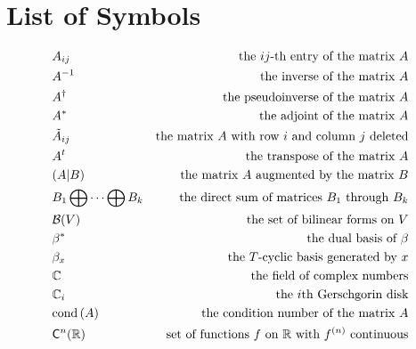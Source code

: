 \chapter{List of Symbols}
\begin{align*}
	 & A_{ij}                            & \text{the $ij$-th entry of the matrix $A$}                                       \\
	 & A^{-1}                            & \text{the inverse of the matrix $A$}                                             \\
	 & A^\dag                            & \text{the pseudoinverse of the matrix $A$}                                       \\
	 & A^*                               & \text{the adjoint of the matrix $A$}                                             \\
	 & \tilde{A}_{ij}                    & \text{the matrix $A$ with row $i$ and column $j$ deleted}                        \\
	 & A^t                               & \text{the transpose of the matrix $A$}                                           \\
	 & (A|B)                             & \text{the matrix $A$ augmented by the matrix $B$}                                \\
	 & B_1 \bigoplus \dots \bigoplus B_k & \text{the direct sum of matrices $B_1$ through $B_k$}                            \\
	 & \mathcal{B}(V)                    & \text{the set of bilinear forms on $V$}                                          \\
	 & \beta^*                           & \text{the dual basis of $\beta$}                                                 \\
	 & \beta_x                           & \text{the $T$-cyclic basis generated by $x$}                                     \\
	 & \C                                & \text{the field of complex numbers}                                              \\
	 & \C_i                              & \text{the $i$th Gerschgorin disk}                                                \\
	 & \cond{A}                          & \text{the condition number of the matrix $A$}                                    \\
	 & \mathsf{C}^n(\R)                  & \text{set of functions $f$ on $\R$ with $f^{(n)}$ continuous}                    \\

\end{align*}
